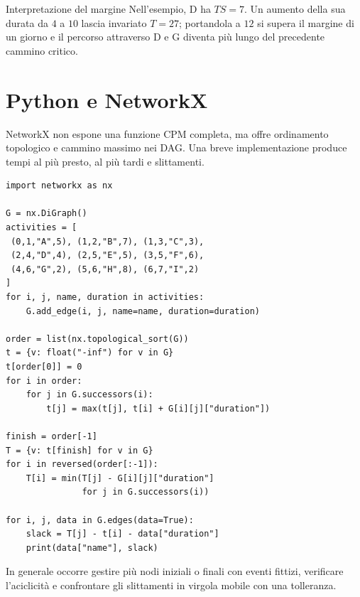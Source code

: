 \documentclass[11pt,a4paper]{article}
\begin{document}
\begin{examplebox}{Interpretazione del margine}
Nell'esempio, D ha $TS=7$. Un aumento della sua durata da $4$ a $10$ lascia invariato $T=27$; portandola a $12$ si supera il margine di un giorno e il percorso attraverso D e G diventa più lungo del precedente cammino critico.
\end{examplebox}

\section{Python e NetworkX}
\begin{networkxbox}
NetworkX non espone una funzione CPM completa, ma offre ordinamento topologico e cammino massimo nei DAG. Una breve implementazione produce tempi al più presto, al più tardi e slittamenti.
\end{networkxbox}

\begin{lstlisting}[style=python,caption={CPM per una rete AOA}]
import networkx as nx

G = nx.DiGraph()
activities = [
 (0,1,"A",5), (1,2,"B",7), (1,3,"C",3),
 (2,4,"D",4), (2,5,"E",5), (3,5,"F",6),
 (4,6,"G",2), (5,6,"H",8), (6,7,"I",2)
]
for i, j, name, duration in activities:
    G.add_edge(i, j, name=name, duration=duration)

order = list(nx.topological_sort(G))
t = {v: float("-inf") for v in G}
t[order[0]] = 0
for i in order:
    for j in G.successors(i):
        t[j] = max(t[j], t[i] + G[i][j]["duration"])

finish = order[-1]
T = {v: t[finish] for v in G}
for i in reversed(order[:-1]):
    T[i] = min(T[j] - G[i][j]["duration"]
               for j in G.successors(i))

for i, j, data in G.edges(data=True):
    slack = T[j] - t[i] - data["duration"]
    print(data["name"], slack)
\end{lstlisting}
In generale occorre gestire più nodi iniziali o finali con eventi fittizi, verificare l'aciclicità e confrontare gli slittamenti in virgola mobile con una tolleranza.
\end{document}
